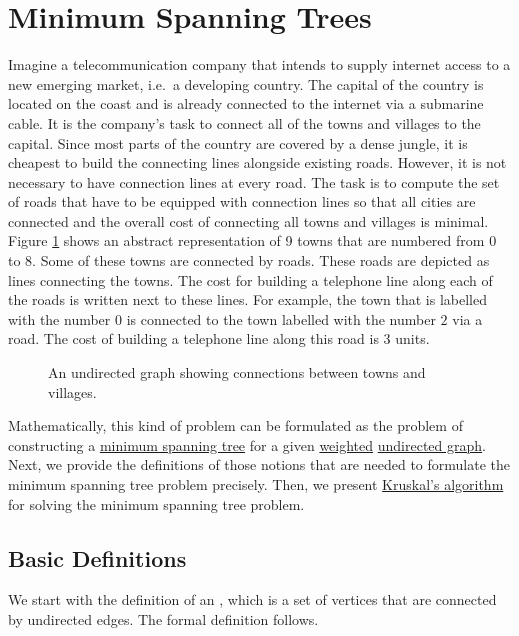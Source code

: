 \section{Minimum Spanning Trees}
Imagine a telecommunication company that intends to supply internet access to a new emerging market, i.e.~a
developing country.  The capital of the country is located on the coast and is already connected to the internet via
a submarine cable. It is the company's task to connect all of the towns and villages to the capital.
Since most parts of the country are covered by a dense jungle, it is cheapest to build the connecting lines
alongside existing roads.  However, it is not necessary to have connection lines at every road.  The task is to
compute the set of roads that have to be equipped with connection lines so that all cities are connected and
the overall cost of connecting all towns and villages is minimal.  Figure \ref{fig:tiny-graph.pdf} shows an
abstract representation of 9 towns that are numbered from $0$ to $8$.  Some of these towns are connected by
roads.  These roads are depicted as lines connecting the towns.  The cost for building a telephone line along each of
the roads is written next to these lines.  For example, the town that is labelled with the number $0$ is connected to the
town labelled with the number $2$ via a road.  The cost of building a telephone line along this road is $3$ units.


\begin{figure}[!ht]
  \centering
  \caption{An undirected graph showing connections between towns and villages.}
  \label{fig:tiny-graph.pdf}
\end{figure}


Mathematically, this kind of problem can be formulated as the problem of
constructing a \href{https://en.wikipedia.org/wiki/Minimum_spanning_tree}{minimum spanning tree} for
a given \href{https://en.wikipedia.org/wiki/Graph_(discrete_mathematics)#Weighted_graph}{weighted}
\href{https://en.wikipedia.org/wiki/Graph_(discrete_mathematics)#Undirected_graph}{undirected graph}.
Next, we provide the definitions of those notions that are needed to formulate the minimum spanning
tree problem precisely.  Then, we present
\href{https://en.wikipedia.org/wiki/Kruskal%27s_algorithm}{Kruskal's algorithm} for solving the
minimum spanning tree problem. 

\subsection{Basic Definitions}
We start with the definition of an , which is a set of vertices that are connected by
undirected edges.  The formal definition follows.

